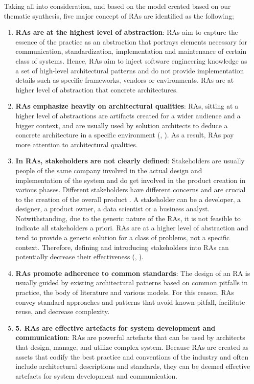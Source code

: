 \documentclass[review]{elsarticle}
\begin{document}
Taking all into consideration, and based on the model created based on our thematic synthesis, five major concept of RAs are identified as the following; 

\begin{enumerate}
    \item \textbf{RAs are at the highest level of abstraction}: RAs aim to capture the essence of the practice as an abstraction that portrays elements necessary for communication, standardization, implementation and maintenance of certain class of systems. Hence, RAs aim to inject software engineering knowledge as a set of high-level architectural patterns and do not provide implementation details such as specific frameworks, vendors or environments. RAs are at higher level of abstraction that concrete architectures. 
   \item \textbf{RAs emphasize heavily on architectural qualities}: RAs, sitting at a higher level of abstractions are artifacts created for a wider audience and a bigger context, and are usually used by solution architects to deduce a concrete architecture in a specific environment (\cite{angelov2008towards}, \cite{stricker2010creating}). As a result, RAs pay more attention to architectural qualities.
   \item \textbf{In RAs, stakeholders are not clearly defined}: Stakeholders are usually people of the same company involved in the actual design and implementation of the system and do get involved in the product creation in various phases. Different stakeholders have different concerns and are crucial to the creation of the overall product \cite{geerdink2013reference}. A stakeholder can be a developer, a designer, a product owner, a data scientist or a business analyst. Notwithstanding, due to the generic nature of the RAs, it is not feasible to indicate all stakeholders a priori. RAs are at a higher level of abstraction and tend to provide a generic solution for a class of problems, not a specific context. Therefore, defining and introducing stakeholders into RAs can potentially decrease their effectiveness (\cite{AtaeiACIS}, \cite{Chang}).
   \item \textbf{RAs promote adherence to common standards}: The design of an RA is usually guided by existing architectural patterns based on common pitfalls in practice, the body of literature and various models. For this reason, RAs convey standard approaches and patterns that avoid known pitfall, facilitate reuse, and decrease complexity. 
   \item \textbf{5.	RAs are effective artefacts for system development and communication}: RAs are powerful artefacts that can be used by architects that design, manage, and utilize complex system. Because RAs are created as assets that codify the best practice and conventions of the industry and often include architectural descriptions and standards, they can be deemed effective artefacts for system development and communication. 
\end{enumerate}
\end{document}
